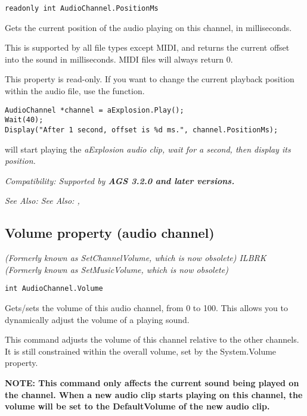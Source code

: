 \begin{verbatim}
readonly int AudioChannel.PositionMs
\end{verbatim}
Gets the current position of the audio playing on this channel, in milliseconds.

This is supported by all file types except MIDI, and returns the current offset into the sound
in milliseconds. MIDI files will always return 0.

This property is read-only. If you want to change the current playback position within the audio file,
use the  function.

\begin{verbatim}
AudioChannel *channel = aExplosion.Play();
Wait(40);
Display("After 1 second, offset is %d ms.", channel.PositionMs);
\end{verbatim}
will start playing the \it{aExplosion} audio clip, wait for a second, then display its position.

\it{Compatibility:} Supported by \bf{AGS 3.2.0} and later versions.

\it{See Also:} \it{See Also:} ,


\subsection{Volume property (audio channel)}\label{AudioChannel.Volume}%

\it{(Formerly known as SetChannelVolume, which is now obsolete)} ILBRK
\it{(Formerly known as SetMusicVolume, which is now obsolete)}

\begin{verbatim}
int AudioChannel.Volume
\end{verbatim}
Gets/sets the volume of this audio channel, from 0 to 100. This allows you to dynamically
adjust the volume of a playing sound.

This command adjusts the volume of this channel relative to the other channels.
It is still constrained within the overall volume, set by the System.Volume property.

\bf{NOTE:} This command only affects the current sound being played on the channel.
When a new audio clip starts playing on this channel, the volume will be set to the
DefaultVolume of the new audio clip.

